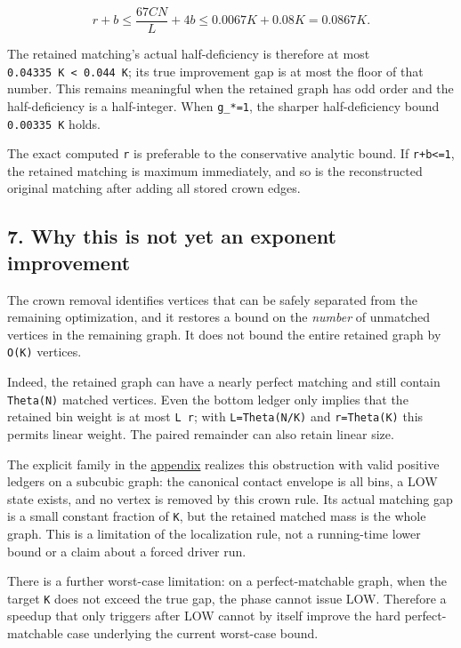 \[
r+b\le\frac{67CN}{L}+4b\le0.0067K+0.08K=0.0867K.
\]

The retained matching's actual half-deficiency is therefore at most \texttt{0.04335\ K\ \textless{}\ 0.044\ K}; its true improvement gap is at most the floor of that number. This remains meaningful when the retained graph has odd order and the half-deficiency is a half-integer. When \texttt{g\_*=1}, the sharper half-deficiency bound \texttt{0.00335\ K} holds.

The exact computed \texttt{r} is preferable to the conservative analytic bound. If \texttt{r+b\textless{}=1}, the retained matching is maximum immediately, and so is the reconstructed original matching after adding all stored crown edges.

\hypertarget{af-f687f276ee-why-this-is-not-yet-an-exponent-improvement}{%
\subsection{7. Why this is not yet an exponent improvement}\label{af-f687f276ee-why-this-is-not-yet-an-exponent-improvement}}

The crown removal identifies vertices that can be safely separated from the remaining optimization, and it restores a bound on the \emph{number} of unmatched vertices in the remaining graph. It does not bound the entire retained graph by \texttt{O(K)} vertices.

Indeed, the retained graph can have a nearly perfect matching and still contain \texttt{Theta(N)} matched vertices. Even the bottom ledger only implies that the retained bin weight is at most \texttt{L\ r}; with \texttt{L=Theta(N/K)} and \texttt{r=Theta(K)} this permits linear weight. The paired remainder can also retain linear size.

The explicit family in the \protect\hyperlink{af-f687f276ee-retained-mass-example}{appendix} realizes this obstruction with valid positive ledgers on a subcubic graph: the canonical contact envelope is all bins, a LOW state exists, and no vertex is removed by this crown rule. Its actual matching gap is a small constant fraction of \texttt{K}, but the retained matched mass is the whole graph. This is a limitation of the localization rule, not a running-time lower bound or a claim about a forced driver run.

There is a further worst-case limitation: on a perfect-matchable graph, when the target \texttt{K} does not exceed the true gap, the phase cannot issue LOW. Therefore a speedup that only triggers after LOW cannot by itself improve the hard perfect-matchable case underlying the current worst-case bound.

